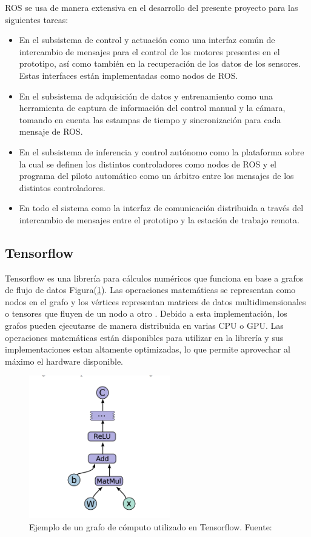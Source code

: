        ROS se usa de manera extensiva en el desarrollo del presente proyecto para las siguientes tareas:

        \begin{itemize}
            \item En el subsistema de control y actuación como una interfaz común de intercambio de mensajes para el control de los motores presentes en el prototipo, así como también en la recuperación de los datos de los sensores. Estas interfaces están implementadas como nodos de ROS.
            \item En el subsistema de adquisición de datos y entrenamiento como una herramienta de captura de información del control manual y la cámara, tomando en cuenta las estampas de tiempo y sincronización para cada mensaje de ROS.
            \item En el subsistema de inferencia y control autónomo como la plataforma sobre la cual se definen los distintos controladores como nodos de ROS y el programa del piloto automático como un árbitro entre los mensajes de los distintos controladores. 
            \item En todo el sistema como la interfaz de comunicación distribuida a través del intercambio de mensajes entre el prototipo y la estación de trabajo remota.
        \end{itemize}

    \subsection{Tensorflow}
    Tensorflow es una librería para cálculos numéricos que funciona en base a grafos de flujo de datos Figura(\ref{fig:grafotf}). Las operaciones matemáticas 
    se representan como nodos en el grafo y los vértices representan matrices de datos multidimensionales o tensores que fluyen de 
    un nodo a otro  \cite{tensorflow2015-whitepaper}. Debido a esta implementación, los grafos pueden ejecutarse de manera distribuida en varias CPU o GPU. Las operaciones 
    matemáticas están disponibles para utilizar en la librería y sus implementaciones estan altamente optimizadas, lo que permite 
    aprovechar al máximo el hardware disponible.

    \begin{figure}[!h] 
        \centering
        \includegraphics[width=0.55\textwidth]{img/grafotf}
        \caption{Ejemplo de un grafo de cómputo utilizado en Tensorflow. Fuente: \cite{asjad_2016} }
        \label{fig:grafotf}
    \end{figure}

